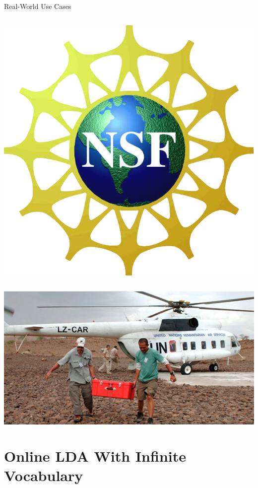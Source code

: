 \documentclass[compress]{beamer}
\begin{document}
\begin{frame}{Real-World Use Cases}
\begin{columns}
  \includegraphics[width=\linewidth]{general_figures/nsf}
\end{columns}

\begin{center}
  \includegraphics[width=.4\linewidth]{interactive_topic_models/disaster}
\end{center}

\end{frame}


\section{Online LDA With Infinite Vocabulary}
\end{document}
